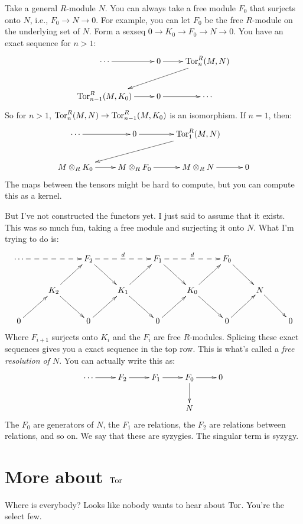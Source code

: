 Take a general $R$-module $N$. You can always take a free module $F_0$ that surjects onto $N$, i.e., $F_0\to N\to 0$. For example, you can let $F_0$ be the free $R$-module on the underlying set of $N$. Form a sexseq $0\to K_0\to F_0\to N\to 0$. You have an exact sequence for $n>1$:
\begin{equation*}
\xymatrix{\cdots\ar[r] & 0\ar[r] & \Tor^R_n(M,N)\ar[dll]\\
\Tor^R_{n-1}(M,K_0)\ar[r] & 0\ar[r] & \cdots}
\end{equation*}
So for $n>1$, $\operatorname{Tor}^R_n(M,N)\to \operatorname{Tor}^R_{n-1}(M,K_0)$ is an isomorphism. If $n=1$, then:
\begin{equation*}
\xymatrix{\cdots\ar[r] & 0\ar[r] & \Tor^R_1(M,N)\ar[dll]\\
M\otimes_R K_0\ar[r] & M\otimes_R F_0\ar[r] & M\otimes_R N\ar[r] & 0}
\end{equation*}
The maps between the tensors might be hard to compute, but you can compute this as a kernel.

But I've not constructed the functors yet. I just said to assume that it exists. This was so much fun, taking a free module and surjecting it onto $N$. What I'm trying to do is:
\begin{equation*}
\xymatrix{\cdots\ar@{-->}[rr] & & F_2\ar[dr]\ar@{-->}[rr]^d & & F_1\ar[dr]\ar@{-->}[rr]^d & & F_0\ar[dr]\\
& K_2\ar[ur]\ar[dr] & & K_1\ar[ur]\ar[dr] & & K_0\ar[ur]\ar[dr] & & N\ar[dr]\\
0\ar[ur] & & 0\ar[ur] & & 0\ar[ur] & & 0\ar[ur] & & 0}
\end{equation*}
Where $F_{i+1}$ surjects onto $K_i$ and the $F_i$ are free $R$-modules. Splicing these exact sequences gives you a exact sequence in the top row. This is what's called a \emph{free resolution of $N$}. You can actually write this as:
\begin{equation*}
\xymatrix{\cdots\ar[r] & F_2\ar[r] & F_1\ar[r] & F_0\ar[r]\ar[d] & 0\\
 & & & N & }
\end{equation*}
The $F_0$ are generators of $N$, the $F_1$ are relations, the $F_2$ are relations between relations, and so on. We say that these are syzygies. The singular term is syzygy.
\section{More about $\operatorname{Tor}$}
Where is everybody? Looks like nobody wants to hear about $\operatorname{Tor}$. You're the select few.

